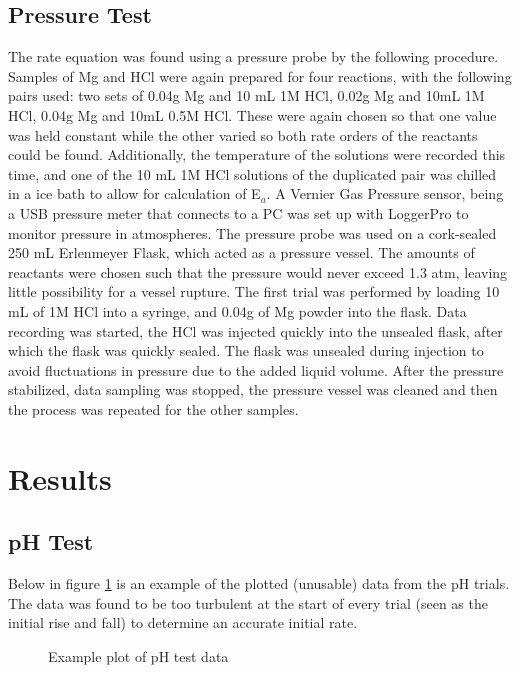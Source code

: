 \documentclass[12pt, letterpaper]{article}
\begin{document}
\subsection{Pressure Test}
The rate equation was found using a pressure probe by the following procedure. Samples of Mg and HCl were again prepared for four reactions, with the following pairs used: two sets of 0.04g Mg and 10 mL 1M HCl, 0.02g Mg and 10mL 1M HCl, 0.04g Mg and 10mL 0.5M HCl. These were again chosen so that one value was held constant while the other varied so both rate orders of the reactants could be found. Additionally, the temperature of the solutions were recorded this time, and one of the 10 mL 1M HCl solutions of the duplicated pair was chilled in a ice bath to allow for calculation of E$_a$. A Vernier Gas Pressure sensor, being a USB pressure meter that connects to a PC was set up with LoggerPro to monitor pressure in atmospheres. The pressure probe was used on a cork-sealed 250 mL Erlenmeyer Flask, which acted as a pressure vessel. The amounts of reactants were chosen such that the pressure would never exceed 1.3 atm, leaving little possibility for a vessel rupture. The first trial was performed by loading 10 mL of 1M HCl into a syringe, and 0.04g of Mg powder into the flask. Data recording was started, the HCl was injected quickly into the unsealed flask, after which the flask was quickly sealed. The flask was unsealed during injection to avoid fluctuations in pressure due to the added liquid volume. After the pressure stabilized, data sampling was stopped, the pressure vessel was cleaned and then the process was repeated for the other samples.

\section{Results}%
\FloatBarrier
\subsection{pH Test}
Below in figure \ref{fig:pH_plot} is an example of the plotted (unusable) data from the pH trials. The data was found to be too turbulent at the start of every trial (seen as the initial rise and fall) to determine an accurate initial rate.
\begin{figure}[h!]
  \begin{center}
    	\resizebox{0.6\textwidth}{!}{}
  \end	{center}
  \caption{Example plot of pH test data}
\label{fig:pH_plot}
\end {figure}
\FloatBarrier
\end{document}
